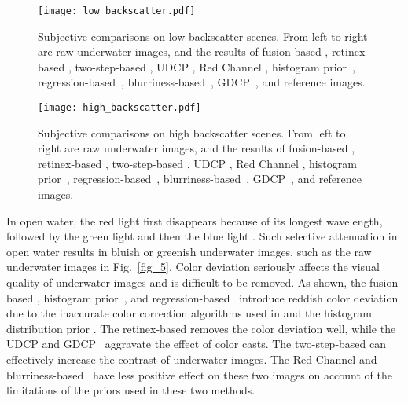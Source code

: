 \documentclass[journal]{IEEEtran}
\begin{document}
\begin{figure*}[!htb]
\centering
\texttt{[image: low\_backscatter.pdf]}
\caption{Subjective comparisons on low backscatter scenes. From left to right are raw underwater images, and the results of fusion-based \cite{Ancuti2012}, retinex-based \cite{Fu2014}, two-step-based \cite{Fu2017}, UDCP \cite{Drews2016}, Red Channel \cite{Galdran2015}, histogram prior~\cite{Li2016}, regression-based~\cite{Li2017prl}, blurriness-based~\cite{Peng2017}, GDCP~\cite{Peng2018}, and reference images.}
\label{fig_8}
\end{figure*}

\begin{figure*}[!htb]
\centering
\texttt{[image: high\_backscatter.pdf]}
\caption{Subjective comparisons on high backscatter scenes. From left to right are raw underwater images, and the results of fusion-based \cite{Ancuti2012}, retinex-based \cite{Fu2014}, two-step-based \cite{Fu2017}, UDCP \cite{Drews2016}, Red Channel \cite{Galdran2015}, histogram prior~\cite{Li2016}, regression-based~\cite{Li2017prl}, blurriness-based~\cite{Peng2017}, GDCP~\cite{Peng2018}, and reference images.}
\label{fig_99}
\end{figure*}



In open water, the red light first disappears because of its longest wavelength, followed by the green light and then the blue light \cite{Akkaynak20172}. Such selective attenuation in open water results in bluish or greenish underwater images, such as the raw underwater images in Fig.~\ref{fig_5}. Color deviation seriously affects the visual quality of underwater images and is difficult to be removed. As shown, the fusion-based \cite{Ancuti2012}, histogram prior~\cite{Li2016}, and regression-based~\cite{Li2017prl} introduce reddish color deviation due to the inaccurate color correction algorithms used in \cite{Ancuti2012,Li2017prl} and the histogram distribution prior \cite{Li2016}. The retinex-based \cite{Fu2014} removes the color deviation well, while the UDCP \cite{Drews2016} and GDCP~\cite{Peng2018} aggravate the effect of color casts. The two-step-based \cite{Fu2017} can effectively increase the contrast of underwater images. The Red Channel \cite{Galdran2015} and blurriness-based~\cite{Peng2017} have less positive effect on these two images on account of the limitations of the priors used in these two methods.
\end{document}

